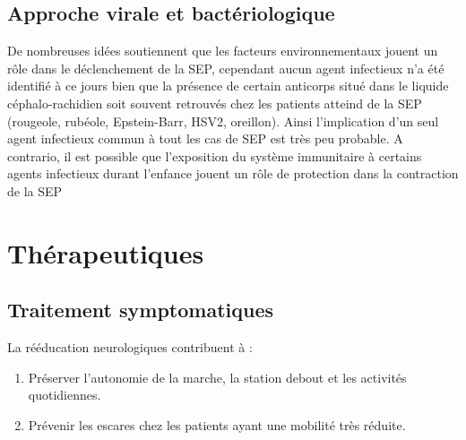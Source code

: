 \documentclass{comjnl}
\begin{document}
\subsection{Approche virale et bactériologique }
De nombreuses idées soutiennent que les facteurs environnementaux jouent un rôle dans le déclenchement de la SEP, cependant aucun agent infectieux n'a été identifié à ce jours bien que la présence de certain anticorps situé dans le liquide céphalo-rachidien soit souvent retrouvés chez les patients atteind de la SEP (rougeole, rubéole, Epstein-Barr, HSV2, oreillon).
Ainsi l'implication d'un seul agent infectieux commun à tout les cas de SEP est très peu probable.
A contrario, il est possible que l'exposition du système immunitaire à certains agents infectieux durant l'enfance jouent un rôle de protection dans la contraction de la SEP \cite{Bach2002}

\section{Thérapeutiques}
\subsection{Traitement symptomatiques}
La rééducation neurologiques contribuent à :
\begin{enumerate}
\item Préserver l'autonomie de la marche, la station debout et les activités quotidiennes.
\item Prévenir les escares chez les patients ayant une mobilité très réduite.
\end{enumerate}




\end{document}
